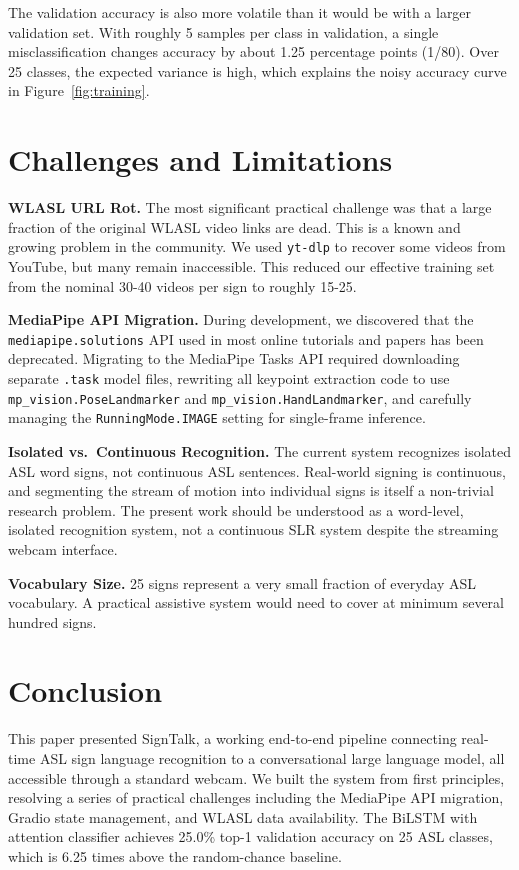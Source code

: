 \documentclass[conference]{IEEEtran}
\begin{document}
The validation accuracy is also more volatile than it would be with a larger validation set. With roughly 5 samples per class in validation, a single misclassification changes accuracy by about 1.25 percentage points (1/80). Over 25 classes, the expected variance is high, which explains the noisy accuracy curve in Figure~\ref{fig:training}.

\section{Challenges and Limitations}

\textbf{WLASL URL Rot.} The most significant practical challenge was that a large fraction of the original WLASL video links are dead. This is a known and growing problem in the community. We used \texttt{yt-dlp} to recover some videos from YouTube, but many remain inaccessible. This reduced our effective training set from the nominal 30-40 videos per sign to roughly 15-25.

\textbf{MediaPipe API Migration.} During development, we discovered that the \texttt{mediapipe.solutions} API used in most online tutorials and papers has been deprecated. Migrating to the MediaPipe Tasks API required downloading separate \texttt{.task} model files, rewriting all keypoint extraction code to use \texttt{mp\_vision.PoseLandmarker} and \texttt{mp\_vision.HandLandmarker}, and carefully managing the \texttt{RunningMode.IMAGE} setting for single-frame inference.

\textbf{Isolated vs.\ Continuous Recognition.} The current system recognizes isolated ASL word signs, not continuous ASL sentences. Real-world signing is continuous, and segmenting the stream of motion into individual signs is itself a non-trivial research problem. The present work should be understood as a word-level, isolated recognition system, not a continuous SLR system despite the streaming webcam interface.

\textbf{Vocabulary Size.} 25 signs represent a very small fraction of everyday ASL vocabulary. A practical assistive system would need to cover at minimum several hundred signs.

\section{Conclusion}

This paper presented SignTalk, a working end-to-end pipeline connecting real-time ASL sign language recognition to a conversational large language model, all accessible through a standard webcam. We built the system from first principles, resolving a series of practical challenges including the MediaPipe API migration, Gradio state management, and WLASL data availability. The BiLSTM with attention classifier achieves 25.0\% top-1 validation accuracy on 25 ASL classes, which is 6.25 times above the random-chance baseline.
\end{document}
